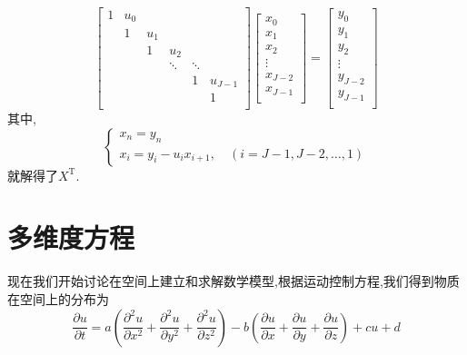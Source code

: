 \begin{equation}
\begin{bmatrix}
1 & u_0       \\
  &  1  & u_1 \\
  &     &   1  &  u_2 \\
  &     &      &   \ddots & \ddots \\
  &     &      &          &    1   & u_{J-1} \\
  &     &      &          &        &      1   \\
\end{bmatrix}
\begin{bmatrix}
x_0 \\
x_1 \\
x_2 \\
\vdots \\
x_{J-2} \\
x_{J-1} \\
\end{bmatrix}=
\begin{bmatrix}
y_0 \\
y_1 \\
y_2 \\
\vdots \\
y_{J-2} \\
y_{J-1} \\ 
\end{bmatrix}
\end{equation}
其中,
\begin{equation}
\begin{cases}
x_n=y_n \\
x_i=y_i-u_ix_{i+1},\quad (i=J-1,J-2,\ldots,1)
\end{cases}
\end{equation}
就解得了$X^{\mathrm{T}}$.
\section{多维度方程}
现在我们开始讨论在空间上建立和求解数学模型,根据运动控制方程,我们得到物质在空间上的分布为
\begin{equation}
 \dfrac{\partial u}{\partial t}=a\left(\dfrac{\partial^2 u}{\partial x^2}+\dfrac{\partial^2 u}{\partial y^2}
 +\dfrac{\partial^2 u}{\partial z^2}\right)-b\left(\dfrac{\partial u}{\partial x}+\dfrac{\partial u}{\partial y}
 +\dfrac{\partial u}{\partial z}\right)+cu+d
\end{equation}
